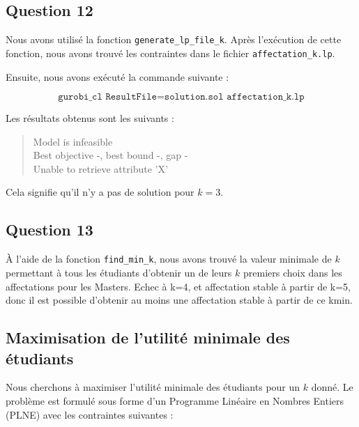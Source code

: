 \documentclass[a4paper,11pt]{article}
\begin{document}
\subsection*{Question 12}

Nous avons utilisé la fonction \texttt{generate\_lp\_file\_k}. Après l'exécution de cette fonction, nous avons trouvé les contraintes dans le fichier \texttt{affectation\_k.lp}.

Ensuite, nous avons exécuté la commande suivante : 

\[
\texttt{gurobi\_cl ResultFile=solution.sol affectation\_k.lp}
\]

Les résultats obtenus sont les suivants :

\begin{quote}
Model is infeasible\\
Best objective -, best bound -, gap -\\
Unable to retrieve attribute 'X'
\end{quote}

Cela signifie qu'il n'y a pas de solution pour \( k = 3 \).

\subsection*{Question 13}

À l'aide de la fonction \texttt{find\_min\_k}, nous avons trouvé la valeur minimale de \( k \) permettant à tous les étudiants d'obtenir un de leurs \( k \) premiers choix dans les affectations pour les Masters. Echec à k=4, et affectation stable à partir de k=5, donc il est possible d'obtenir au moins une affectation stable à partir de ce kmin.


\subsection*{Maximisation de l'utilité minimale des étudiants}

Nous cherchons à maximiser l'utilité minimale des étudiants pour un \( k \) donné. Le problème est formulé sous forme d'un Programme Linéaire en Nombres Entiers (PLNE) avec les contraintes suivantes :
\end{document}
